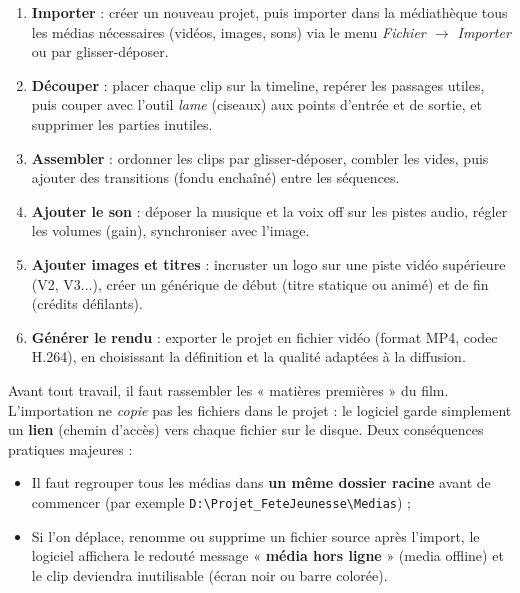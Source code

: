 \documentclass[11pt]{article}
\newcounter{popsec}
\newcounter{popsub}
\newcommand{\courssub}[1]{%
  \stepcounter{popsub}%
  \par\vspace{9pt}\noindent{\popxbold\fontsize{11.5}{13}\selectfont\color{popink}{\color{poporange}\thepopsec.\thepopsub}\hspace{6pt}#1}\par\nopagebreak\vspace{4pt}
}
\begin{document}
\begin{methode}
\begin{enumerate}
  \item \textbf{Importer} : créer un nouveau projet, puis importer dans la médiathèque tous les médias nécessaires (vidéos, images, sons) via le menu \emph{Fichier $\rightarrow$ Importer} ou par glisser-déposer.
  \item \textbf{Découper} : placer chaque clip sur la timeline, repérer les passages utiles, puis couper avec l'outil \emph{lame} (ciseaux) aux points d'entrée et de sortie, et supprimer les parties inutiles.
  \item \textbf{Assembler} : ordonner les clips par glisser-déposer, combler les vides, puis ajouter des transitions (fondu enchaîné) entre les séquences.
  \item \textbf{Ajouter le son} : déposer la musique et la voix off sur les pistes audio, régler les volumes (gain), synchroniser avec l'image.
  \item \textbf{Ajouter images et titres} : incruster un logo sur une piste vidéo supérieure (V2, V3...), créer un générique de début (titre statique ou animé) et de fin (crédits défilants).
  \item \textbf{Générer le rendu} : exporter le projet en fichier vidéo (format MP4, codec H.264), en choisissant la définition et la qualité adaptées à la diffusion.
\end{enumerate}
\end{methode}

\courssub{Importer les médias}

Avant tout travail, il faut rassembler les « matières premières » du film. L'importation ne \emph{copie} pas les fichiers dans le projet : le logiciel garde simplement un \textbf{lien} (chemin d'accès) vers chaque fichier sur le disque. Deux conséquences pratiques majeures :

\begin{itemize}
  \item Il faut regrouper tous les médias dans \textbf{un même dossier racine} avant de commencer (par exemple \texttt{D:\textbackslash Projet\_FeteJeunesse\textbackslash Medias}) ;
  \item Si l'on déplace, renomme ou supprime un fichier source après l'import, le logiciel affichera le redouté message « \textbf{média hors ligne} » (media offline) et le clip deviendra inutilisable (écran noir ou barre colorée).
\end{itemize}
\end{document}
